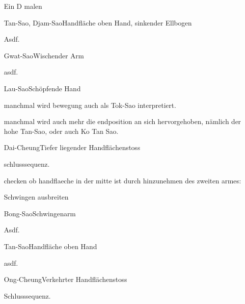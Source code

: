 \begin{WTSatz}{Ein D malen}%

	
	\begin{WTSatzTeil}{Tan-Sao, Djam-Sao}{Handfl\"ache oben Hand, sinkender Ellbogen}
		
		Asdf.
	\end{WTSatzTeil}
	\begin{WTSatzTeil}{Gwat-Sao}{Wischender Arm}
		
		asdf.
	\end{WTSatzTeil}
	\begin{WTSatzTeil}{Lau-Sao}{Sch\"opfende Hand}
		
		manchmal wird bewegung auch als Tok-Sao interpretiert.
		
		manchmal wird auch mehr die endposition an sich hervorgehoben, n\"amlich der hohe Tan-Sao, oder auch Ko Tan Sao.
		
		
	\end{WTSatzTeil}
	\begin{WTSatzTeil}{Dai-Cheung}{Tiefer liegender Handfl\"achenstoss}
		
		schlusssequenz.
		
		checken ob handflaeche in der mitte ist durch hinzunehmen des zweiten armes:
	\end{WTSatzTeil}
\end{WTSatz}


\begin{WTSatz}{Schwingen ausbreiten}%

	
	\begin{WTSatzTeil}{Bong-Sao}{Schwingenarm}
		
		Asdf.
	\end{WTSatzTeil}
	\begin{WTSatzTeil}{Tan-Sao}{Handfl\"ache oben Hand}
		
		asdf.
	\end{WTSatzTeil}
	\begin{WTSatzTeil}{Ong-Cheung}{Verkehrter Handfl\"achenstoss}
		
		
		Schlusssequenz.
	\end{WTSatzTeil}
\end{WTSatz}


